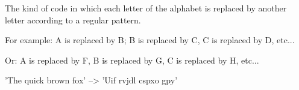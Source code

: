 The kind of code in which each letter of the alphabet is replaced by 
another letter according to a regular pattern. 
\par
For example: A is replaced
by B; B is replaced by C, C is replaced by D, etc...
\par
Or: A is replaced by F, B is replaced by G, C is replaced by H, etc... 
\par
'The quick brown fox' --> 'Uif rvjdl cspxo gpy'